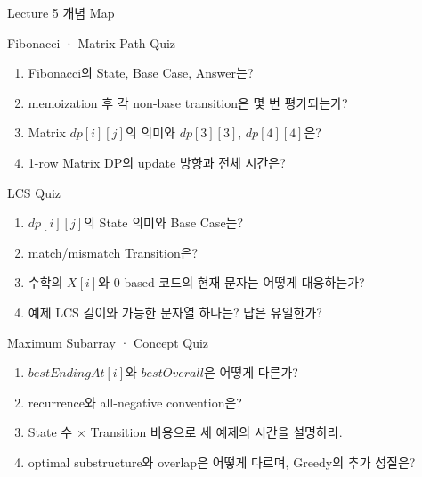 \begin{frame}{Lecture 5 개념 Map}
\centering{}
\end{frame}
\begin{frame}{Fibonacci · Matrix Path Quiz}
\begin{enumerate}
\item Fibonacci의 State, Base Case, Answer는?
\item memoization 후 각 non-base transition은 몇 번 평가되는가?
\item Matrix $dp[i][j]$의 의미와 $dp[3][3]$, $dp[4][4]$은?
\item 1-row Matrix DP의 update 방향과 전체 시간은?
\end{enumerate}
\end{frame}
\begin{frame}{LCS Quiz}
\begin{enumerate}
\item $dp[i][j]$의 State 의미와 Base Case는?
\item match/mismatch Transition은?
\item 수학의 $X[i]$와 0-based 코드의 현재 문자는 어떻게 대응하는가?
\item 예제 LCS 길이와 가능한 문자열 하나는? 답은 유일한가?
\end{enumerate}
\end{frame}
\begin{frame}{Maximum Subarray · Concept Quiz}
\begin{enumerate}
\item $bestEndingAt[i]$와 $bestOverall$은 어떻게 다른가?
\item recurrence와 all-negative convention은?
\item State 수 × Transition 비용으로 세 예제의 시간을 설명하라.
\item optimal substructure와 overlap은 어떻게 다르며, Greedy의 추가 성질은?
\end{enumerate}
\end{frame}
